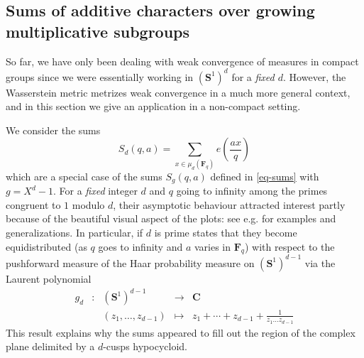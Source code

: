 \documentclass[12pt]{amsart}
\newcommand{\Cc}{\mathbf{C}}
\newcommand{\Ss}{\mathbf{S}}
\newcommand{\Ff}{\mathbf{F}}
\theoremstyle{plain}
\theoremstyle{remark}
\theoremstyle{definition}
\begin{document}
\subsection{Sums of additive characters over growing multiplicative
  subgroups} \label{sec: growing d}

So far, we have only been dealing with weak convergence of measures in
compact groups since we were essentially working in $(\Ss^1)^d$ for a
\emph{fixed $d$}. However, the Wasserstein metric metrizes weak
convergence in a much more general context, and in this section we
give an application in a non-compact setting.

We consider the sums
$$
S_d(q,a) = \sum_{x \in \mu_d(\Ff_q)}^{} e\left(\frac{ax}{q}\right)
$$
which are a special case of the sums $S_g(q,a)$ defined in \eqref{eq-sums} with $g = X^d -1$. For
a \emph{fixed} integer $d$ and $q$ going to infinity among the primes
congruent to $1$ modulo $d$, their asymptotic behaviour attracted
interest partly because of the beautiful visual aspect of the plots:
see e.g. \cite{gaussian_periods, burkhardt,menagerie,untrau, platt}
for examples and generalizations. In particular, if $d$ is prime
\cite[Th. 6.3]{gaussian_periods} states that they become
equidistributed (as $q$ goes to infinity and $a$ varies in $\Ff_q$)
with respect to the pushforward measure of the Haar probability
measure on $(\Ss^1)^{d-1}$ via the Laurent polynomial
$$
\begin{array}{ccccc}
  g_d& : &(\Ss^1)^{d-1} & \to & \Cc \\ &&
                                          (z_1, \dots, z_{d-1}) & \mapsto & z_1 + \cdots + z_{d-1} + \frac{1}{z_1 \dots z_{d-1}}
\end{array}
$$
This result explains why the sums appeared to fill out the region of
the complex plane delimited by a $d$-cusps hypocycloid.
\end{document}
